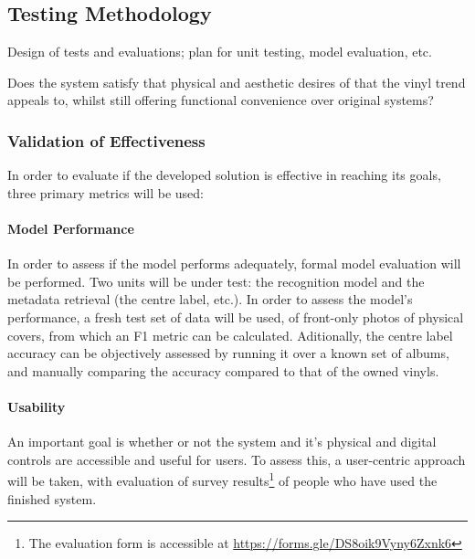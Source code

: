         \subsection{Testing Methodology}
    
            \begin{temp}
                Design of tests and evaluations; plan for unit testing, model evaluation, etc.
                
                Does the system satisfy that physical and aesthetic desires of that the vinyl trend appeals to, whilst still offering functional convenience over original systems?
            \end{temp}
            
            \subsubsection{Validation of Effectiveness}
    
                In order to evaluate if the developed solution is effective in reaching its goals, three primary metrics will be used:
    
                \paragraph{Model Performance} In order to assess if the model performs adequately, formal model evaluation will be performed. Two units will be under test: the recognition model and the metadata retrieval (the centre label, etc.). In order to assess the model's performance, a fresh test set of data will be used, of front-only photos of physical covers, from which an F1 metric can be calculated. Aditionally, the centre label accuracy can be objectively assessed by running it over a known set of albums, and manually comparing the accuracy compared to that of the owned vinyls.
    
                \paragraph{Usability} An important goal is whether or not the system and it's physical and digital controls are accessible and useful for users. To assess this, a user-centric approach will be taken, with evaluation of survey results\footnote{The evaluation form is accessible at \href{https://forms.gle/DS8oik9Vyny6Zxnk6}{https://forms.gle/DS8oik9Vyny6Zxnk6}} of people who have used the finished system.
    
